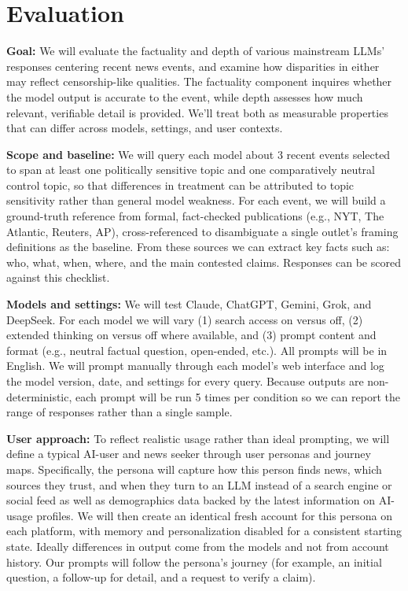 \section{Evaluation}\label{sec:evaluation}

\textbf{Goal:} We will evaluate the factuality and depth of various mainstream LLMs' responses centering recent news events, and examine how disparities in either may reflect censorship-like qualities. The factuality component inquires whether the model output is accurate to the event, while depth assesses how much relevant, verifiable detail is provided. We'll treat both as measurable properties that can differ across models, settings, and user contexts.

\textbf{Scope and baseline:} We will query each model about 3 recent events selected to span at least one politically sensitive topic and one comparatively neutral control topic, so that differences in treatment can be attributed to topic sensitivity rather than general model weakness. For each event, we will build a ground-truth reference from formal, fact-checked publications (e.g., NYT, The Atlantic, Reuters, AP), cross-referenced to disambiguate a single outlet's framing definitions as the baseline. From these sources we can extract key facts such as: who, what, when, where, and the main contested claims. Responses can be scored against this checklist.

\textbf{Models and settings:} We will test Claude, ChatGPT, Gemini, Grok, and DeepSeek. For each model we will vary (1) search access on versus off, (2) extended thinking on versus off where available, and (3) prompt content and format (e.g., neutral factual question, open-ended, etc.). All prompts will be in English. We will prompt manually through each model's web interface and log the model version, date, and settings for every query. Because outputs are non-deterministic, each prompt will be run 5 times per condition so we can report the range of responses rather than a single sample.

\textbf{User approach:} To reflect realistic usage rather than ideal prompting, we will define a typical AI-user and news seeker through user personas and journey maps. Specifically, the persona will capture how this person finds news, which sources they trust, and when they turn to an LLM instead of a search engine or social feed as well as demographics data backed by the latest information on AI-usage profiles. We will then create an identical fresh account for this persona on each platform, with memory and personalization disabled for a consistent starting state. Ideally differences in output come from the models and not from account history. Our prompts will follow the persona's journey (for example, an initial question, a follow-up for detail, and a request to verify a claim).

